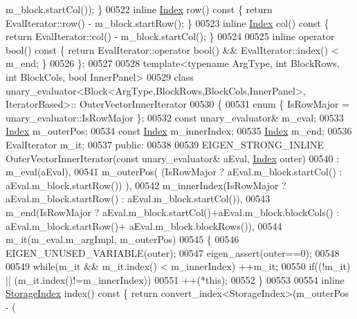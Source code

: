 \begin{DoxyCode}
      m\_block.startCol()); \}
00522   \textcolor{keyword}{inline} \hyperlink{group___core___module_a554f30542cc2316add4b1ea0a492ff02}{Index} row()\textcolor{keyword}{    const }\{ \textcolor{keywordflow}{return} EvalIterator::row()   - m\_block.startRow(); \}
00523   \textcolor{keyword}{inline} \hyperlink{group___core___module_a554f30542cc2316add4b1ea0a492ff02}{Index} col()\textcolor{keyword}{    const }\{ \textcolor{keywordflow}{return} EvalIterator::col()   - m\_block.startCol(); \}
00524 
00525   \textcolor{keyword}{inline} \textcolor{keyword}{operator} bool()\textcolor{keyword}{ const }\{ \textcolor{keywordflow}{return} EvalIterator::operator bool() && EvalIterator::index() < m\_end; \}
00526 \};
00527 
00528 \textcolor{keyword}{template}<\textcolor{keyword}{typename} ArgType, \textcolor{keywordtype}{int} BlockRows, \textcolor{keywordtype}{int} BlockCols, \textcolor{keywordtype}{bool} InnerPanel>
00529 \textcolor{keyword}{class }unary\_evaluator<Block<ArgType,BlockRows,BlockCols,InnerPanel>, IteratorBased>::
      OuterVectorInnerIterator
00530 \{
00531   \textcolor{keyword}{enum} \{ IsRowMajor = unary\_evaluator::IsRowMajor \};
00532   \textcolor{keyword}{const} unary\_evaluator& m\_eval;
00533   \hyperlink{group___core___module_a554f30542cc2316add4b1ea0a492ff02}{Index} m\_outerPos;
00534   \textcolor{keyword}{const} \hyperlink{group___core___module_a554f30542cc2316add4b1ea0a492ff02}{Index} m\_innerIndex;
00535   \hyperlink{group___core___module_a554f30542cc2316add4b1ea0a492ff02}{Index} m\_end;
00536   EvalIterator m\_it;
00537 \textcolor{keyword}{public}:
00538 
00539   EIGEN\_STRONG\_INLINE OuterVectorInnerIterator(\textcolor{keyword}{const} unary\_evaluator& aEval, 
      \hyperlink{group___core___module_a554f30542cc2316add4b1ea0a492ff02}{Index} outer)
00540     : m\_eval(aEval),
00541       m\_outerPos( (IsRowMajor ? aEval.m\_block.startCol() : aEval.m\_block.startRow()) ),
00542       m\_innerIndex(IsRowMajor ? aEval.m\_block.startRow() : aEval.m\_block.startCol()),
00543       m\_end(IsRowMajor ? aEval.m\_block.startCol()+aEval.m\_block.blockCols() : aEval.m\_block.startRow()+
      aEval.m\_block.blockRows()),
00544       m\_it(m\_eval.m\_argImpl, m\_outerPos)
00545   \{
00546     EIGEN\_UNUSED\_VARIABLE(outer);
00547     eigen\_assert(outer==0);
00548 
00549     \textcolor{keywordflow}{while}(m\_it && m\_it.index() < m\_innerIndex) ++m\_it;
00550     \textcolor{keywordflow}{if}((!m\_it) || (m\_it.index()!=m\_innerIndex))
00551       ++(*this);
00552   \}
00553 
00554   \textcolor{keyword}{inline} \hyperlink{group___sparse_core___module_a0b540ba724726ebe953f8c0df06081ed}{StorageIndex} index()\textcolor{keyword}{ const }\{ \textcolor{keywordflow}{return} convert\_index<StorageIndex>(m\_outerPos - (

\end{DoxyCode}
